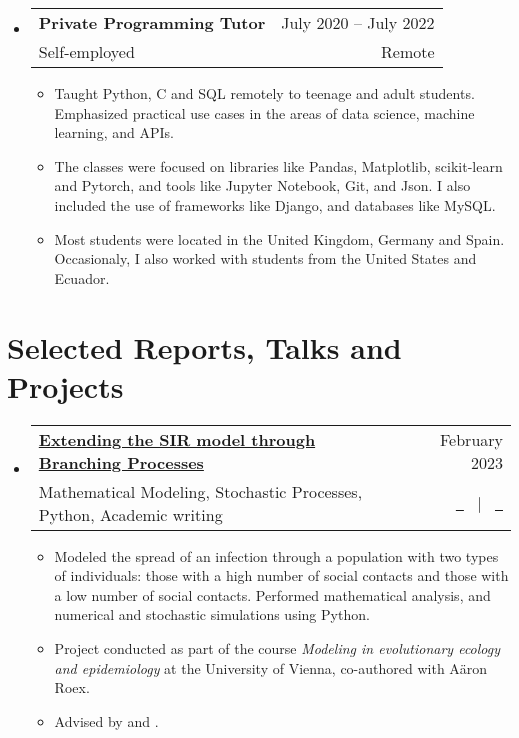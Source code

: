 \documentclass[a4paper,10pt]{article}
\makeatletter
\newcommand{\resumeQuadHeading}[4]{
  \item
  \begin{tabular*}{0.96\textwidth}[t]{l@{\extracolsep{\fill}}r}
    \textbf{#1} & \small #2 \\
    \small#3 & \small #4 \\
  \end{tabular*}
}
\newcommand{\resumeHeadingListStart}{
  \begin{itemize}[leftmargin=0.15in, label={}]
}
\newcommand{\resumeHeadingListEnd}{\end{itemize}}
\makeatother
\begin{document}
  
  \resumeHeadingListStart{}
    \resumeQuadHeading{Private Programming Tutor}{July 2020 – July 2022}
    {Self-employed}{Remote}
    \begin{itemize}[leftmargin=3em, itemsep=0.1em, topsep=2pt]
      \item \small Taught Python, C and SQL remotely to teenage and adult students. Emphasized practical use cases in the areas of data science, machine learning, and APIs.
      \item \small The classes were focused on libraries like Pandas, Matplotlib, scikit-learn and Pytorch, and tools like Jupyter Notebook, Git, and Json. I also included the use of frameworks like Django, and databases like MySQL. 
      \item \small Most students were located in the United Kingdom, Germany and Spain. Occasionaly, I also worked with students from the United States and Ecuador.
    \end{itemize}
  \resumeHeadingListEnd{}



\section{Selected Reports, Talks and Projects}
  \resumeHeadingListStart{}
  \resumeQuadHeading{\href{https://github.com/loredanasandu/sir-branching-processes}{Extending the SIR model through Branching Processes}}{February 2023}{\small Mathematical Modeling, Stochastic Processes, Python, Academic writing}{\href{https://github.com/loredanasandu/sir-branching-processes/blob/main/Report_Extending-the-SIR-model-through-BP.pdf}{\faFileTextO \ \graydotuline{Report}} \ $|$ \ \href{https://github.com/loredanasandu/sir-branching-processes/blob/main/Code_Extending-the-SIR-model-through-BP.ipynb}{\faGithub \ \graydotuline{Code}}}
  \begin{itemize}[leftmargin=3em, itemsep=0.1em, topsep=2pt]
    \item \small Modeled the spread of an infection through a population with two types of individuals: those with a high number of social contacts and those with a low number of social contacts. Performed mathematical analysis, and numerical and stochastic simulations using Python.
    \item \small Project conducted as part of the course \textit{Modeling in evolutionary ecology and epidemiology} at the University of Vienna, co-authored with Aäron Roex.
    \item \small Advised by \href{https://ufind.univie.ac.at/en/person.html?id=110430}{} and \href{https://mabshtml.univie.ac.at/polechova/}{}.
  \end{itemize}
  \resumeHeadingListEnd{}
\end{document}
